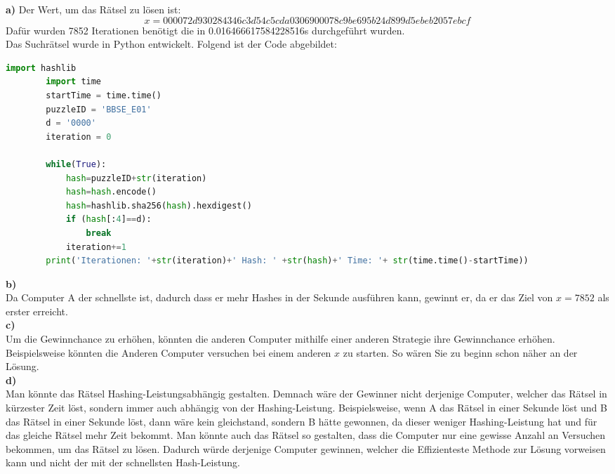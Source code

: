 \documentclass[german]{../uebung}
\begin{document}
\begin{exercise}{4}\textbf{a)}
    Der Wert, um das Rätsel zu lösen ist: \[x=000072d930284346c3d54c5cda0306900078c9be695b24d899d5ebeb2057ebcf\] Dafür wurden 7852 Iterationen benötigt die in 0.016466617584228516s durchgeführt wurden.\\
    Das Suchrätsel wurde in Python entwickelt. Folgend ist der Code abgebildet:
    \begin{lstlisting}[language=Python]
        import hashlib 
        import time 
        startTime = time.time() 
        puzzleID = 'BBSE_E01' 
        d = '0000'
        iteration = 0
        
        while(True):
            hash=puzzleID+str(iteration)
            hash=hash.encode()
            hash=hashlib.sha256(hash).hexdigest()
            if (hash[:4]==d):
                break
            iteration+=1
        print('Iterationen: '+str(iteration)+' Hash: ' +str(hash)+' Time: '+ str(time.time()-startTime))
    \end{lstlisting}
    \textbf{b)}\\
    Da Computer A der schnellste ist, dadurch dass er mehr Hashes in der Sekunde ausführen kann, gewinnt er, da er das Ziel von \(x=7852\) als erster erreicht.\\
    \textbf{c)}\\
    Um die Gewinnchance zu erhöhen, könnten die anderen Computer mithilfe einer anderen Strategie ihre Gewinnchance erhöhen. Beispielsweise könnten die Anderen Computer versuchen bei einem anderen \(x\) zu starten. So wären Sie zu beginn schon näher an der Lösung.\\
    \textbf{d)}\\
    Man könnte das Rätsel Hashing-Leistungsabhängig gestalten. Demnach wäre der Gewinner nicht derjenige Computer, welcher das Rätsel in kürzester Zeit löst, sondern immer auch abhängig von der Hashing-Leistung. Beispielsweise, wenn A das Rätsel in einer Sekunde löst und B das Rätsel in einer Sekunde löst, dann wäre kein gleichstand, sondern B hätte gewonnen, da dieser weniger Hashing-Leistung hat und für das gleiche Rätsel mehr Zeit bekommt.
    Man könnte auch das Rätsel so gestalten, dass die Computer nur eine gewisse Anzahl an Versuchen bekommen, um das Rätsel zu lösen. Dadurch würde derjenige Computer gewinnen, welcher die Effizienteste Methode zur Lösung vorweisen kann und nicht der mit der schnellsten Hash-Leistung.\\
\end{exercise}\\
\end{document}
